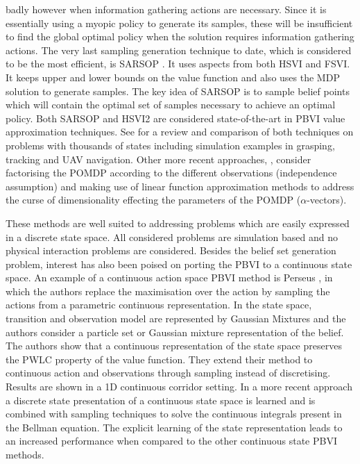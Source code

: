 badly however when information gathering actions are necessary. Since it is essentially using a myopic policy to generate its samples, these will be insufficient to 
find the global optimal policy when the solution requires information gathering actions. The very last sampling generation technique to date, which is considered to be the most efficient, 
is SARSOP \citep{SARSOP}. It uses aspects from both HSVI and FSVI. It keeps upper and lower bounds on the value function and also uses the MDP solution to generate samples. 
The key idea of SARSOP is to sample belief points which will contain the optimal set of samples necessary to achieve an optimal policy.  
Both SARSOP and HSVI2 are considered state-of-the-art in PBVI value approximation techniques. See \cite{POMDP_approach_2010} for a review and comparison of both techniques on problems 
with thousands of states including simulation examples in grasping, tracking and UAV navigation. Other more recent approaches, \cite{Veiga14aaai}, consider factorising the POMDP 
according to the different observations (independence assumption) and making use of linear function approximation methods to 
address the curse of dimensionality effecting the parameters of the POMDP ($\alpha$-vectors).

These methods are well suited to addressing problems which are easily expressed in a discrete state space. All considered problems are simulation based and 
no physical interaction problems are considered. Besides the belief set generation problem, interest has also been poised on porting the PBVI to a continuous state space.
An example of a continuous action space PBVI method is Perseus \citep{Spaan05icra}, in which the authors replace the maximisation over the action by sampling the actions from a 
parametric continuous representation. In \cite{PBVI_C_2006} the state space, transition and observation model are represented by Gaussian Mixtures and the authors consider a particle set or Gaussian mixture representation of the belief. 
The authors show that a continuous representation of the state space preserves the PWLC property of the value function. They extend their method to continuous action and observations 
through sampling instead of discretising. Results are shown in a 1D continuous corridor setting. In a 
more recent approach \cite{solving_continous_pomdps_2013} a discrete state presentation of a continuous state space is learned and is combined with sampling
techniques to solve the continuous integrals present in the Bellman equation. The explicit learning of the state representation leads to an increased performance
when compared to the other continuous state PBVI methods. 

